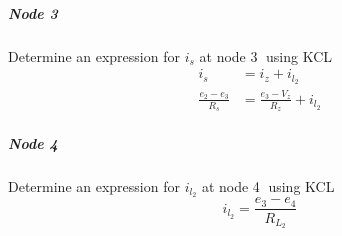 \subparagraph{Node \textcircled{3}}
Determine an expression for $i_s$ at node \textcircled{3} using KCL
\begin{equation}
	\begin{split}
		i_s &= i_z + i_{l_2} \\
		\frac{e_2 - e_3}{R_s} &= \frac{e_3 - V_z}{R_z} + i_{l_2}
	\end{split}
	\label{eq:inductiveLoad_node3}
\end{equation}

\subparagraph{Node \textcircled{4}}
Determine an expression for $i_{l_2}$ at node \textcircled{4} using KCL
\begin{equation}
	i_{l_2} = \frac{e_3 - e_4}{R_{L_2}}
	\label{eq:inductiveLoad_node4}
\end{equation}